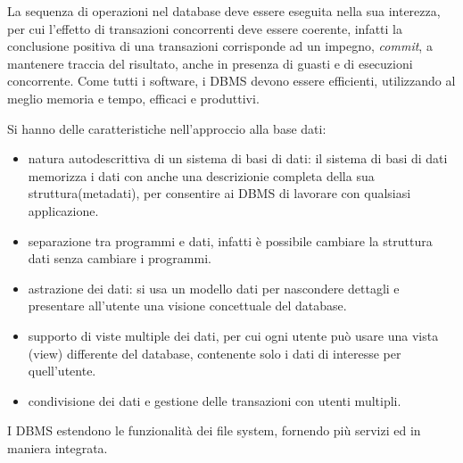 \documentclass[a4paper,12pt, oneside]{book}
\begin{document}
La sequenza di operazioni nel database deve essere eseguita nella sua interezza, per cui l'effetto di 
transazioni concorrenti deve essere coerente, infatti la conclusione positiva di una transazioni corrisponde ad un impegno,
\emph{commit}, a mantenere traccia del risultato, anche in presenza di guasti e di esecuzioni concorrente.\newline
Come tutti i software, i DBMS devono essere efficienti, utilizzando al meglio memoria e tempo, efficaci e produttivi.

Si hanno delle caratteristiche nell'approccio alla base dati:
\begin{itemize}
    \item natura autodescrittiva di un sistema di basi di dati: il sistema di basi di dati memorizza i dati con
          anche una descrizionie completa della sua struttura(metadati), per consentire ai DBMS di lavorare con qualsiasi applicazione.
    \item separazione tra programmi e dati, infatti è possibile cambiare la struttura dati senza cambiare i programmi.
    \item astrazione dei dati: si usa un modello dati per nascondere dettagli e presentare
            all'utente una visione concettuale del database.
    \item supporto di viste multiple dei dati, per cui ogni utente può usare una vista (view) differente del
          database, contenente solo i dati di interesse per quell'utente.
    \item condivisione dei dati e gestione delle transazioni con utenti multipli.
\end{itemize}
I DBMS estendono le funzionalità dei file system, fornendo più servizi ed in maniera integrata.
\end{document}
